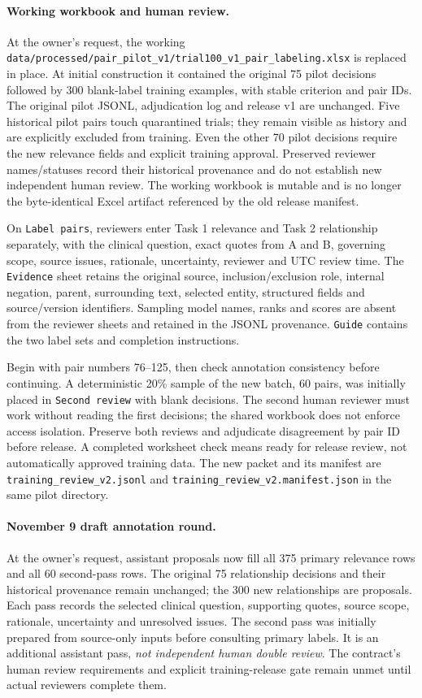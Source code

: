 \documentclass[10pt,letterpaper]{article}
\newcommand{\pathcode}[1]{\nolinkurl{#1}}
\begin{document}
\paragraph{Working workbook and human review.}
At the owner's request, the working
\pathcode{data/processed/pair_pilot_v1/trial100_v1_pair_labeling.xlsx}
is replaced in place. At initial construction it contained the original 75 pilot
decisions followed by 300 blank-label training examples, with stable criterion and pair IDs.
The original pilot JSONL, adjudication log and release v1 are unchanged. Five
historical pilot pairs touch quarantined trials; they remain visible as history
and are explicitly excluded from training. Even the other 70 pilot decisions
require the new relevance fields and explicit training approval. Preserved
reviewer names/statuses record their historical provenance and do not establish
new independent human review. The working workbook is mutable and is no longer
the byte-identical Excel artifact referenced by the old release manifest.

On \texttt{Label pairs}, reviewers enter Task 1 relevance and Task 2 relationship
separately, with the clinical question, exact quotes from A and B, governing
scope, source issues, rationale, uncertainty, reviewer and UTC review time.
The \texttt{Evidence} sheet retains the original source, inclusion/exclusion
role, internal negation, parent, surrounding text, selected entity, structured
fields and source/version identifiers. Sampling model names, ranks and scores
are absent from the reviewer sheets and retained in the JSONL provenance.
\texttt{Guide} contains the two label sets and completion instructions.

Begin with pair numbers 76--125, then check annotation consistency before
continuing. A deterministic 20\% sample of the new batch, 60 pairs, was initially placed in
\texttt{Second review} with blank decisions. The second human reviewer must work
without reading the first decisions; the shared workbook does not enforce
access isolation. Preserve both reviews and adjudicate disagreement by pair ID
before release. A completed worksheet check means ready for release review,
not automatically approved training data. The new packet and its manifest are
\pathcode{training_review_v2.jsonl} and
\pathcode{training_review_v2.manifest.json} in the same pilot directory.

\paragraph{November 9 draft annotation round.}
At the owner's request, assistant proposals now fill all 375 primary relevance
rows and all 60 second-pass rows. The original 75 relationship decisions and
their historical provenance remain unchanged; the 300 new relationships are
proposals. Each pass records the selected clinical question, supporting quotes,
source scope, rationale, uncertainty and unresolved issues. The second pass was
initially prepared from source-only inputs before consulting primary labels.
It is an additional assistant pass, \emph{not independent human double review}.
The contract's human review requirements and explicit training-release gate
remain unmet until actual reviewers complete them.
\end{document}

